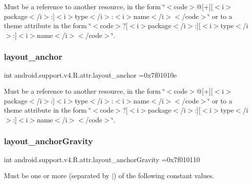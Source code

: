 Must be a reference to another resource, in the form \char`\"{}$<$code$>$@\mbox{[}+\mbox{]}\mbox{[}$<$i$>$package$<$/i$>$\+:\mbox{]}$<$i$>$type$<$/i$>$\+:$<$i$>$name$<$/i$>$$<$/code$>$\char`\"{} or to a theme attribute in the form \char`\"{}$<$code$>$?\mbox{[}$<$i$>$package$<$/i$>$\+:\mbox{]}\mbox{[}$<$i$>$type$<$/i$>$\+:\mbox{]}$<$i$>$name$<$/i$>$$<$/code$>$\char`\"{}. \mbox{\label{classandroid_1_1support_1_1v4_1_1R_1_1attr_a1bdef82525d3965c0bfa3c87fa463972}} 
\subsubsection{\texorpdfstring{layout\+\_\+anchor}{layout\_anchor}}
{\footnotesize\ttfamily int android.\+support.\+v4.\+R.\+attr.\+layout\+\_\+anchor =0x7f01010e\hspace{0.3cm}{\ttfamily [static]}}

Must be a reference to another resource, in the form \char`\"{}$<$code$>$@\mbox{[}+\mbox{]}\mbox{[}$<$i$>$package$<$/i$>$\+:\mbox{]}$<$i$>$type$<$/i$>$\+:$<$i$>$name$<$/i$>$$<$/code$>$\char`\"{} or to a theme attribute in the form \char`\"{}$<$code$>$?\mbox{[}$<$i$>$package$<$/i$>$\+:\mbox{]}\mbox{[}$<$i$>$type$<$/i$>$\+:\mbox{]}$<$i$>$name$<$/i$>$$<$/code$>$\char`\"{}. \mbox{\label{classandroid_1_1support_1_1v4_1_1R_1_1attr_a7b903ff169eccd661e399a2c828c411c}} 
\subsubsection{\texorpdfstring{layout\+\_\+anchor\+Gravity}{layout\_anchorGravity}}
{\footnotesize\ttfamily int android.\+support.\+v4.\+R.\+attr.\+layout\+\_\+anchor\+Gravity =0x7f010110\hspace{0.3cm}{\ttfamily [static]}}

Must be one or more (separated by \textquotesingle{}$\vert$\textquotesingle{}) of the following constant values.

